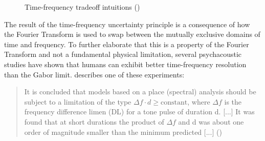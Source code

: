 \documentclass[report.tex]{subfiles}
\begin{document}
\begin{figure}[ht]
	\centering
	\hspace{2em}
	\caption{Time-frequency tradeoff intuitions (\cite[103, 106]{gabor2})}
	\label{fig:gaborfirst}
\end{figure}

The result of the time-frequency uncertainty principle is a consequence of how the Fourier Transform is used to swap between the mutually exclusive domains of time and frequency. To further elaborate that this is a property of the Fourier Transform and not a fundamental physical limitation, several psychacoustic studies have shown that humans can exhibit better time-frequency resolution than the Gabor limit. \citeauthor{psycho2} describes one of these experiments:

\begin{quote}
	It is concluded that models based on a place (spectral) analysis should be subject to a limitation of the type $\Delta f \cdot d \ge \text{constant}$, where $\Delta f$ is the frequency difference limen (DL) for a tone pulse of duration d. [...]  It was found that at short durations the product of $\Delta f$ and d was about one order of magnitude smaller than the minimum predicted [...] (\cite[610]{psycho2})
\end{quote}
\end{document}
